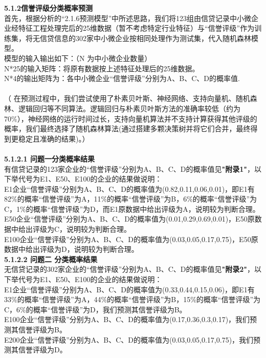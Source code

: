 \documentclass[bwprint]{cumcm}
\begin{document}
\noindent \textbf{ 5.1.2信誉评级分类概率预测}\\
\indent 首先，根据分析的“2.1.6预测模型”中所述思路，我们将123组由信贷记录中小微企业经特征工程处理完后的25维数据（暂不考虑特定行业特征）与“信誉评级”作为训练集，将无信贷信息的302家中小微企业按相同处理作为测试集，代入随机森林模型。\\
模型的输入输出如下：（N 为中小微企业数量）\\
N*25的输入矩阵：将原有数据按上述特征处理后的25维数据。\\
N*4的输出矩阵为：各中小微企业“信誉评级”分别为A、B、C、D的概率值.\\
\\
 （ 在预测过程中，我们尝试使用了朴素贝叶斯、神经网络、支持向量机、随机森林、逻辑回归等不同算法。逻辑回归与朴素贝叶斯方法的准确率较低（约为70\%），神经网络的运行时间过长，支持向量机算法并不支持计算获得其他评级的概率，我们最终选择了随机森林算法(通过搭建多颗决策树并将它们合并，最终得到更稳定且准确的结果)。）\\
\\
\noindent \textbf{ 5.1.2.1 问题一分类概率结果}\\
\indent 有信贷记录的123家企业的“信誉评级”分别为A、B、C、D的概率值见\textbf{"附录1"}，以下举代号为E1、E50、E100的企业的结果做说明：\\
\indent E1企业“信誉评级”分别为A、B、C、D的概率值为(0.82,0.11,0.06,0.01)，即E1有82\%的概率“信誉评级”为A，11\%的概率“信誉评级”为B，6\%的概率“信誉评级”为C，1\%的概率“信誉评级”为D，而E1原数据中给出评级为A，说明较为判断合理。\\
\indent E50企业“信誉评级”分别为A、B、C、D的概率值为(0.01,0.29,0.69,0.01)，E50原数据中给出评级为C，说明较为判断合理。\\
\indent E100企业“信誉评级”分别为A、B、C、D的概率值为(0.03,0.05,0.17,0.75)，E50原数据中给出评级为D，说明较为判断合理。\\

\noindent \textbf{ 5.1.2.2 问题二 分类概率结果}\\
\indent 无信贷记录的302家企业的“信誉评级”分别为A、B、C、D的概率值见\textbf{"附录2"}，以下举代号为E1、E50、E100的企业的结果做说明：\\
\indent E1企业“信誉评级”分别为A、B、C、D的概率值为(0.33,0.44,0.15,0.06)，即E1有33\%的概率“信誉评级”为A，44\%的概率“信誉评级”为B，15\%的概率“信誉评级”为C，6\%的概率“信誉评级”为D，我们预测其信誉评级为B。\\
\indent E100企业“信誉评级”分别为A、B、C、D的概率值为(0.17,0.36,0.3,0.17)，我们预测其信誉评级为B。\\
\indent E200企业“信誉评级”分别为A、B、C、D的概率值为(0.03,0.05,0.17,0.75)，我们预测其信誉评级为D。\\
\end{document}
